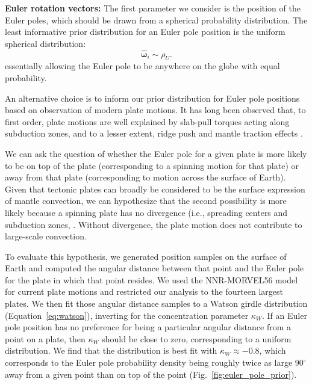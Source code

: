 \documentclass[]{agujournal2019}
\providecommand{\DIFadd}[1]{{\protect\color{blue}\uwave{#1}}} %
\providecommand{\DIFdel}[1]{{\protect\color{red}\sout{#1}}}                      %
\providecommand{\DIFaddbegin}{} %
\providecommand{\DIFaddend}{} %
\providecommand{\DIFdelbegin}{} %
\providecommand{\DIFdelend}{} %
\begin{document}
\textbf{Euler rotation vectors:} 
The first parameter we consider is the position of the Euler poles, which should be drawn from a spherical probability distribution. The least informative prior distribution for an Euler pole position is the uniform spherical distribution:
\begin{equation}
\hat{\mathbf{\omega}}_i \sim \rho_U.
\end{equation}
essentially allowing the Euler pole to be anywhere on the globe with equal probability.

An alternative choice is to inform our prior distribution for Euler pole positions based on observation of modern plate motions. It has long been observed that, to first order, plate motions are well explained by slab-pull torques acting along subduction zones, and to a lesser extent, ridge push and mantle traction effects \cite{Forsyth1975a, Gordon1978a, Richardson1992a}. 

We can ask the question of whether the Euler pole for a given plate is more likely to be on top of the plate (corresponding to a spinning motion for that plate) or away from that plate (corresponding to motion across the surface of Earth). Given that tectonic plates can broadly be considered to be the surface expression of mantle convection, we can hypothesize that the second possibility is more likely because a spinning plate has no divergence (i.e., spreading centers and subduction zones, \cite{Forte1987a, Gable1991a}. Without divergence, the plate motion does not contribute to large-scale convection.

To evaluate this hypothesis, we generated position samples on the surface of Earth and computed the angular distance between that point and the Euler pole for the plate in which that point resides. We used the NNR-MORVEL56 model for current plate motions \cite{Argus2011a} and restricted our analysis to the fourteen largest plates. We then fit those angular distance samples to a Watson girdle distribution (Equation~\ref{eq:watson}),  inverting for the concentration parameter $\kappa_W$. If an Euler pole position has no preference for being a particular angular distance from a point on a plate, then $\kappa_W$ should be close to zero, corresponding to a uniform distribution. We find that the distribution is best fit with \DIFdelbegin \DIFdel{$\kappa_W \approx -0.8$}\DIFdelend \DIFaddbegin \DIFadd{$\kappa_W \approx -0.7$}\DIFaddend , which corresponds to the Euler pole probability density being roughly twice as large $90^\circ$ away from a given point than on top of the point (Fig.~\ref{fig:euler_pole_prior}).
\end{document}
